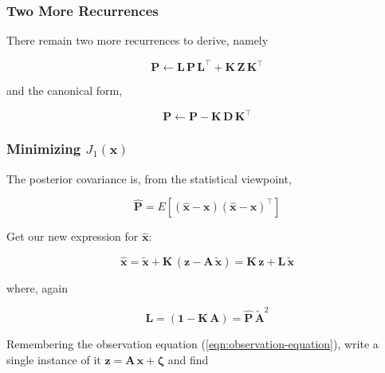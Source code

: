\documentclass[10pt,oneside,x11names]{article}
\begin{document}
\subsubsection{Two More Recurrences}
\label{sec:orgheadline14}

There remain
two more recurrences to derive, namely

\begin{equation}
\label{eqn:p-is-lplt-plus-kzkt}
\mathbold{P}\leftarrow
\mathbold{L}\,
\mathbold{P}\,
\mathbold{L}^\intercal +
\mathbold{K}\,
\mathbold{Z}\,
\mathbold{K}^\intercal
\end{equation}

\noindent and the canonical form,

\begin{equation}
\label{eqn:p-is-p-minus-kdkt}
\mathbold{P}\leftarrow
\mathbold{P} -
\mathbold{K}\,
\mathbold{D}\,
\mathbold{K}^\intercal
\end{equation}

\subsubsection{Minimizing \(J_1({\mathbold{x}})\)}
\label{sec:orgheadline15}

The posterior covariance is, from the statistical viewpoint,

\begin{equation*}
{\hat{\mathbold{P}}} =
E
\left[
({\hat{\mathbold{x}}}-\mathbold{x})
({\hat{\mathbold{x}}}-\mathbold{x})^\intercal
\right]
\end{equation*}

\noindent Get our new expression for \({\hat{\mathbold{x}}}\):

\begin{equation*}
{\hat{\mathbold{x}}} =
{\tilde{\mathbold{x}}}+
\mathbold{K}\,
(\mathbold{z}-
\mathbold{A}\,
{\tilde{\mathbold{x}}}) =
\mathbold{K}\,
\mathbold{z} +
\mathbold{L}\,
{\tilde{\mathbold{x}}}
\end{equation*}

\noindent where, again

\begin{equation*}
\mathbold{L}
=
(\mathbold{1}-
\mathbold{K}\,
\mathbold{A})
=
{\hat{\mathbold{P}}}\,
{\tilde{\mathbold{A}}}^2
\end{equation*}

\noindent
Remembering the observation equation
(\ref{eqn:observation-equation}), write a single instance of it
\(\mathbold{z} =
\mathbold{A}\,
\mathbold{x}+
\mathbold{\zeta}\) and find
\end{document}
